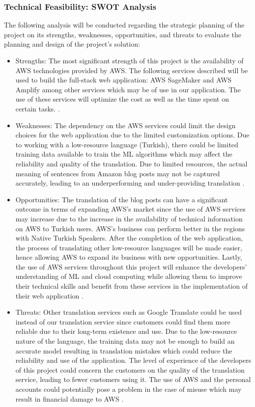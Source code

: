 \subsubsection*{Technical Feasibility: SWOT Analysis}

\indent \indent The following analysis will be conducted regarding the strategic planning of the project on its strengths, weaknesses, opportunities, and threats to evaluate the planning and design of the project's solution: 

\begin{itemize}
  \item Strengths: 
  The most significant strength of this project is the availability of AWS technologies provided by AWS. The following services described will be used to build the full-stack web application: AWS SageMaker and AWS Amplify among other services which may be of use in our application. The use of these services will optimize the cost as well as the time spent on certain tasks. \cite{ChatGPT}. 
  \item Weaknesses: The dependency on the AWS services could limit the design choices for the web application due to the limited customization options. Due to working with a low-resource language (Turkish), there could be limited training data available to train the ML algorithms which may affect the reliability and quality of the translation. Due to limited resources, the actual meaning of sentences from Amazon blog posts may not be captured accurately, leading to an underperforming and under-providing translation \cite{ChatGPT}. 
  \item Opportunities: The translation of the blog posts can have a significant outcome in terms of expanding AWS's market since the use of AWS services may increase due to the increase in the availability of technical information on AWS to Turkish users. AWS's business can perform better in the regions with Native Turkish Speakers. After the completion of the web application, the process of translating other low-resource languages will be made easier, hence allowing AWS to expand its business with new opportunities. Lastly, the use of AWS services throughout this project will enhance the developers' understanding of ML and cloud computing while allowing them to improve their technical skills and benefit from these services in the implementation of their web application \cite{ChatGPT}. 
  \item Threats: Other translation services such as Google Translate could be used instead of our translation service since customers could find them more reliable due to their long-term existence and use. Due to the low-resource nature of the language, the training data may not be enough to build an accurate model resulting in translation mistakes which could reduce the reliability and use of the application. The level of experience of the developers of this project could concern the customers on the quality of the translation service, leading to fewer customers using it. The use of AWS and the personal accounts could potentially pose a problem in the case of misuse which may result in financial damage to AWS \cite{ChatGPT}. 


\end{itemize}
